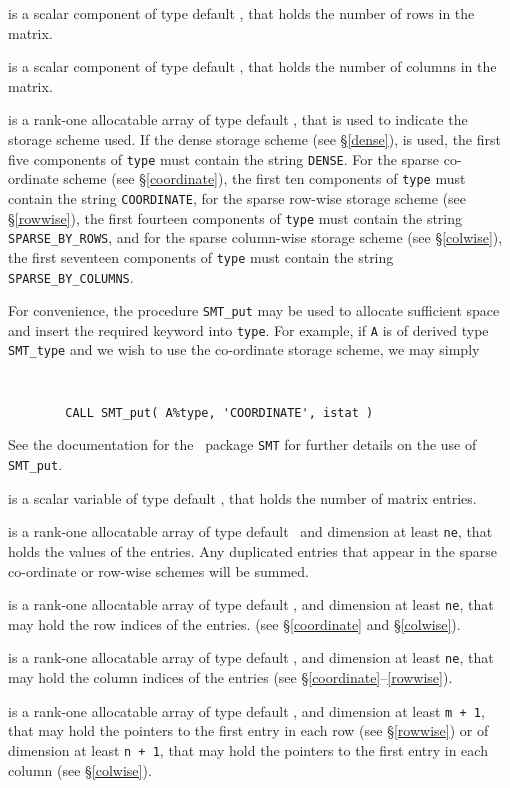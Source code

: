\documentclass{galahad}
\begin{document}
\begin{description}

 is a scalar component of type default \integer,
that holds the number of rows in the matrix.

 is a scalar component of type default \integer,
that holds the number of columns in the matrix.

 is a rank-one allocatable array of type default \character, that
is used to indicate the storage scheme used. If the dense storage scheme
(see \S\ref{dense}), is used,
the first five components of {\tt type} must contain the
string {\tt DENSE}.
For the sparse co-ordinate scheme (see \S\ref{coordinate}),
the first ten components of {\tt type} must contain the
string {\tt COORDINATE},
for the sparse row-wise storage scheme (see \S\ref{rowwise}),
the first fourteen components of {\tt type} must contain the
string {\tt SPARSE\_BY\_ROWS}, and
for the sparse column-wise storage scheme (see \S\ref{colwise}),
the first seventeen components of {\tt type} must contain the
string {\tt SPARSE\_BY\_COLUMNS}.

For convenience, the procedure {\tt SMT\_put}
may be used to allocate sufficient space and insert the required keyword
into {\tt type}.
For example, if {\tt A} is of derived type {\tt SMT\_type}
and we wish to use the co-ordinate storage scheme, we may simply
{\tt
\begin{verbatim}
        CALL SMT_put( A%type, 'COORDINATE', istat )
\end{verbatim}
}
\noindent
See the documentation for the \galahad\ package {\tt SMT}
for further details on the use of {\tt SMT\_put}.

 is a scalar variable of type default \integer, that
holds the number of matrix entries.

 is a rank-one allocatable array of type default \realdp\,
and dimension at least {\tt ne}, that holds the values of the entries.
Any duplicated entries that appear in the sparse
co-ordinate or row-wise schemes will be summed.

 is a rank-one allocatable array of type default \integer,
and dimension at least {\tt ne}, that may hold the row indices of the entries.
(see \S\ref{coordinate} and \S\ref{colwise}).

 is a rank-one allocatable array of type default \integer,
and dimension at least {\tt ne}, that may hold the column indices of the entries
(see \S\ref{coordinate}--\ref{rowwise}).

 is a rank-one allocatable array of type default \integer,
and dimension at least {\tt m + 1}, that may hold the pointers to
the first entry in each row (see \S\ref{rowwise}) or of dimension
at least {\tt n + 1}, that may hold the pointers to
the first entry in each column (see \S\ref{colwise}).

\end{description}
\end{document}

